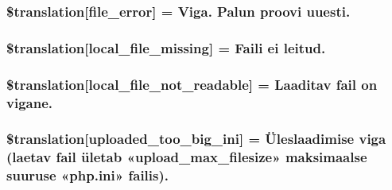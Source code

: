 \subsubsection[{\$translation}]{\setlength{\rightskip}{0pt plus 5cm}\$translation\mbox{[}\textquotesingle{}file\+\_\+error\textquotesingle{}\mbox{]} = \textquotesingle{}Viga. Palun proovi uuesti.\textquotesingle{}}\label{class_8upload_8et___e_e_8php_ac7498e49b9771b04698029aa61c70821}
\hypertarget{class_8upload_8et___e_e_8php_a6ec3d3a47ab70d77e7aa593e82ead10e}{}
\subsubsection[{\$translation}]{\setlength{\rightskip}{0pt plus 5cm}\$translation\mbox{[}\textquotesingle{}local\+\_\+file\+\_\+missing\textquotesingle{}\mbox{]} = \textquotesingle{}Faili ei leitud.\textquotesingle{}}\label{class_8upload_8et___e_e_8php_a6ec3d3a47ab70d77e7aa593e82ead10e}
\hypertarget{class_8upload_8et___e_e_8php_a60104befef9b241f3a7a6a755618a4b3}{}
\subsubsection[{\$translation}]{\setlength{\rightskip}{0pt plus 5cm}\$translation\mbox{[}\textquotesingle{}local\+\_\+file\+\_\+not\+\_\+readable\textquotesingle{}\mbox{]} = \textquotesingle{}Laaditav fail on vigane.\textquotesingle{}}\label{class_8upload_8et___e_e_8php_a60104befef9b241f3a7a6a755618a4b3}
\hypertarget{class_8upload_8et___e_e_8php_a6a08dcd0d3651fdd098568f6b2f0a42c}{}
\subsubsection[{\$translation}]{\setlength{\rightskip}{0pt plus 5cm}\$translation\mbox{[}\textquotesingle{}uploaded\+\_\+too\+\_\+big\+\_\+ini\textquotesingle{}\mbox{]} = \textquotesingle{}Üleslaadimise viga (laetav fail ületab «upload\+\_\+max\+\_\+filesize» maksimaalse suuruse «php.\+ini» failis).\textquotesingle{}}\label{class_8upload_8et___e_e_8php_a6a08dcd0d3651fdd098568f6b2f0a42c}
\hypertarget{class_8upload_8et___e_e_8php_a623d5b8b92169f57d7e43458aa911cbb}{}
